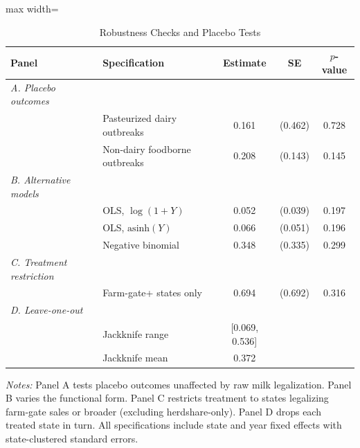 \begin{table}[t]
\centering
\caption{Robustness Checks and Placebo Tests}
\label{tab:robust}
\begin{adjustbox}{max width=\textwidth}
\begin{tabular}{llccc}
\hline\hline
Panel & Specification & Estimate & SE & $p$-value \\
\hline
\textit{A. Placebo outcomes} & & & & \\
& Pasteurized dairy outbreaks & 0.161 & (0.462) & 0.728 \\
& Non-dairy foodborne outbreaks & 0.208 & (0.143) & 0.145 \\
\hline
\textit{B. Alternative models} & & & & \\
& OLS, $\log(1+Y)$ & 0.052 & (0.039) & 0.197 \\
& OLS, $\text{asinh}(Y)$ & 0.066 & (0.051) & 0.196 \\
& Negative binomial & 0.348 & (0.335) & 0.299 \\
\hline
\textit{C. Treatment restriction} & & & & \\
& Farm-gate+ states only & 0.694 & (0.692) & 0.316 \\
\hline
\textit{D. Leave-one-out} & & & & \\
& Jackknife range & [0.069, 0.536] & & \\
& Jackknife mean & 0.372 & & \\
\hline\hline
\end{tabular}
\end{adjustbox}
\begin{tablenotes}[flushleft]
\small
\item \textit{Notes:} Panel A tests placebo outcomes unaffected by raw milk legalization. Panel B varies the functional form. Panel C restricts treatment to states legalizing farm-gate sales or broader (excluding herdshare-only). Panel D drops each treated state in turn. All specifications include state and year fixed effects with state-clustered standard errors.
\end{tablenotes}
\end{table}
